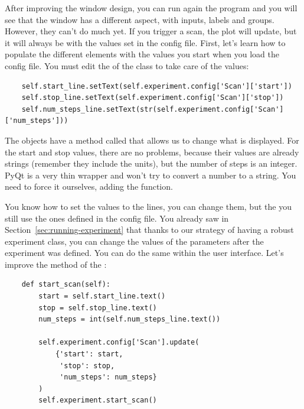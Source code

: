 
After improving the window design, you can run again the program and you will see that the window has a different aspect, with inputs, labels and groups. However, they can't do much yet. If you trigger a scan, the plot will update, but it will always be with the values set in the config file. First, let's learn how to populate the different elements with the values you start when you load the config file. You must edit the  of the  class to take care of the values:

\begin{verbatim}
    self.start_line.setText(self.experiment.config['Scan']['start'])
    self.stop_line.setText(self.experiment.config['Scan']['stop'])
    self.num_steps_line.setText(str(self.experiment.config['Scan'] ['num_steps']))
\end{verbatim}

The  objects have a method called  that allows us to change what is displayed. For the start and stop values, there are no problems, because their values are already strings (remember they include the units), but the number of steps is an integer. PyQt is a very thin wrapper and won't try to convert a number to a string. You need to force it ourselves, adding the  function.


You know how to set the values to the lines, you can change them, but the you still use the ones defined in the config file. You already saw in Section~\ref{sec:running-experiment} that thanks to our strategy of having a robust experiment class, you can change the values of the parameters after the experiment was defined. You can do the same within the user interface. Let's improve the  method of the :

\begin{verbatim}
    def start_scan(self):
        start = self.start_line.text()
        stop = self.stop_line.text()
        num_steps = int(self.num_steps_line.text())

        self.experiment.config['Scan'].update(
            {'start': start,
             'stop': stop,
             'num_steps': num_steps}
        )
        self.experiment.start_scan()
\end{verbatim}

